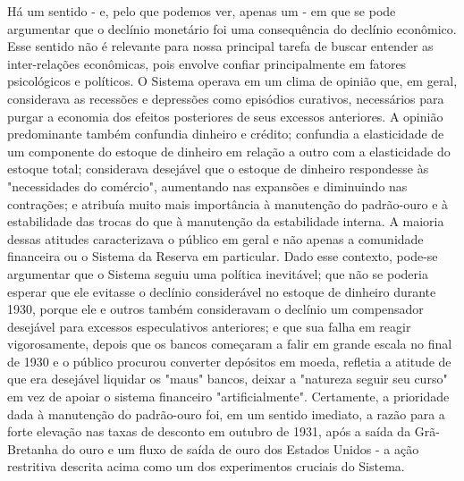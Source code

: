 \documentclass[12pt]{article}
\begin{document}
Há um sentido - e, pelo que podemos ver, apenas um - em que se pode argumentar que o declínio monetário foi uma consequência do declínio econômico. Esse sentido não é relevante para nossa principal tarefa de buscar entender as inter-relações econômicas, pois envolve confiar principalmente em fatores psicológicos e políticos. O Sistema operava em um clima de opinião que, em geral, considerava as recessões e depressões como episódios curativos, necessários para purgar a economia dos efeitos posteriores de seus excessos anteriores. A opinião predominante também confundia dinheiro e crédito; confundia a elasticidade de um componente do estoque de dinheiro em relação a outro com a elasticidade do estoque total; considerava desejável que o estoque de dinheiro respondesse às "necessidades do comércio", aumentando nas expansões e diminuindo nas contrações; e atribuía muito mais importância à manutenção do padrão-ouro e à estabilidade das trocas do que à manutenção da estabilidade interna. A maioria dessas atitudes caracterizava o público em geral e não apenas a comunidade financeira ou o Sistema da Reserva em particular. Dado esse contexto, pode-se argumentar que o Sistema seguiu uma política inevitável; que não se poderia esperar que ele evitasse o declínio considerável no estoque de dinheiro durante 1930, porque ele e outros também consideravam o declínio um compensador desejável para excessos especulativos anteriores; e que sua falha em reagir vigorosamente, depois que os bancos começaram a falir em grande escala no final de 1930 e o público procurou converter depósitos em moeda, refletia a atitude de que era desejável liquidar os "maus" bancos, deixar a "natureza seguir seu curso" em vez de apoiar o sistema financeiro "artificialmente". Certamente, a prioridade dada à manutenção do padrão-ouro foi, em um sentido imediato, a razão para a forte elevação nas taxas de desconto em outubro de 1931, após a saída da Grã-Bretanha do ouro e um fluxo de saída de ouro dos Estados Unidos - a ação restritiva descrita acima como um dos experimentos cruciais do Sistema.
\end{document}
